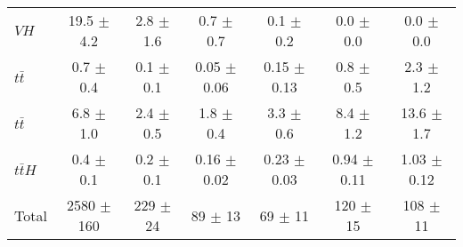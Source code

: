 \begin{tabular}{|l|c|c|c|c|c|c|}
  $VH$   & 19.5 $\pm$ 4.2 & 2.8 $\pm$ 1.6 & 0.7 $\pm$ 0.7 & 0.1 $\pm$ 0.2 & 0.0 $\pm$ 0.0 & 0.0 $\pm$ 0.0 \\ 
  $t\bar{t}$   & 0.7 $\pm$ 0.4 & 0.1 $\pm$ 0.1 & 0.05 $\pm$ 0.06 & 0.15 $\pm$ 0.13 & 0.8 $\pm$ 0.5 & 2.3 $\pm$ 1.2 \\ 
  $t\bar{t}$   & 6.8 $\pm$ 1.0 & 2.4 $\pm$ 0.5 & 1.8 $\pm$ 0.4 & 3.3 $\pm$ 0.6 & 8.4 $\pm$ 1.2 & 13.6 $\pm$ 1.7 \\ 
  $t\bar{t}H$   & 0.4 $\pm$ 0.1 & 0.2 $\pm$ 0.1 & 0.16 $\pm$ 0.02 & 0.23 $\pm$ 0.03 & 0.94 $\pm$ 0.11 & 1.03 $\pm$ 0.12 \\ 
\hline 
  Total  & 2580 $\pm$ 160 & 229 $\pm$ 24 & 89 $\pm$ 13 & 69 $\pm$ 11 & 120 $\pm$ 15 & 108 $\pm$ 11 \\ 
\hline 
\end{tabular} 
